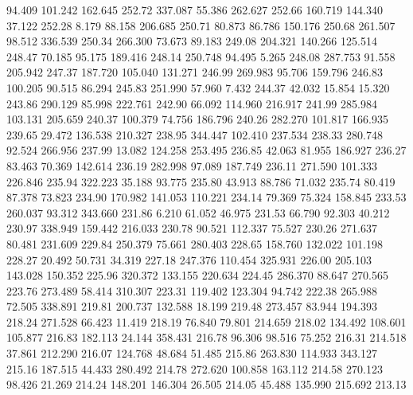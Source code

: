   94.409  101.242  162.645       252.72
 337.087   55.386  262.627       252.66
 160.719  144.340   37.122       252.28
   8.179   88.158  206.685       250.71
  80.873   86.786  150.176       250.68
 261.507   98.512  336.539       250.34
 266.300   73.673   89.183       249.08
 204.321  140.266  125.514       248.47
  70.185   95.175  189.416       248.14
 250.748   94.495    5.265       248.08
 287.753   91.558  205.942       247.37
 187.720  105.040  131.271       246.99
 269.983   95.706  159.796       246.83
 100.205   90.515   86.294       245.83
 251.990   57.960    7.432       244.37
  42.032   15.854   15.320       243.86
 290.129   85.998  222.761       242.90
  66.092  114.960  216.917       241.99
 285.984  103.131  205.659       240.37
 100.379   74.756  186.796       240.26
 282.270  101.817  166.935       239.65
  29.472  136.538  210.327       238.95
 344.447  102.410  237.534       238.33
 280.748   92.524  266.956       237.99
  13.082  124.258  253.495       236.85
  42.063   81.955  186.927       236.27
  83.463   70.369  142.614       236.19
 282.998   97.089  187.749       236.11
 271.590  101.333  226.846       235.94
 322.223   35.188   93.775       235.80
  43.913   88.786   71.032       235.74
  80.419   87.378   73.823       234.90
 170.982  141.053  110.221       234.14
  79.369   75.324  158.845       233.53
 260.037   93.312  343.660       231.86
   6.210   61.052   46.975       231.53
  66.790   92.303   40.212       230.97
 338.949  159.442  216.033       230.78
  90.521  112.337   75.527       230.26
 271.637   80.481  231.609       229.84
 250.379   75.661  280.403       228.65
 158.760  132.022  101.198       228.27
  20.492   50.731   34.319       227.18
 247.376  110.454  325.931       226.00
 205.103  143.028  150.352       225.96
 320.372  133.155  220.634       224.45
 286.370   88.647  270.565       223.76
 273.489   58.414  310.307       223.31
 119.402  123.304   94.742       222.38
 265.988   72.505  338.891       219.81
 200.737  132.588   18.199       219.48
 273.457   83.944  194.393       218.24
 271.528   66.423   11.419       218.19
  76.840   79.801  214.659       218.02
 134.492  108.601  105.877       216.83
 182.113   24.144  358.431       216.78
  96.306   98.516   75.252       216.31
 214.518   37.861  212.290       216.07
 124.768   48.684   51.485       215.86
 263.830  114.933  343.127       215.16
 187.515   44.433  280.492       214.78
 272.620  100.858  163.112       214.58
 270.123   98.426   21.269       214.24
 148.201  146.304   26.505       214.05
  45.488  135.990  215.692       213.13
